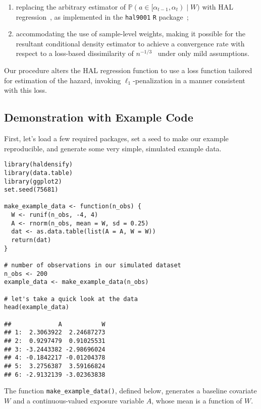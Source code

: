 \begin{enumerate}
  \item replacing the arbitrary estimator of $\mathbb{P}(a \in [\alpha_{t-1},
      \alpha_t) \mid W)$ with HAL regression~\citep{vdl2015generally,
      benkeser2016highly,vdl2017generally}, as implemented in the
      \texttt{hal9001} \texttt{R} package~\citep{coyle2021hal9001,
      hejazi2020hal9001};
  \item accommodating the use of sample-level weights, making it possible for
     the resultant conditional density estimator to achieve a convergence rate
     with respect to a loss-based dissimilarity of
     $n^{-1/3}$~\citep{bibaut2019fast} under only mild assumptions.
\end{enumerate}

Our procedure alters the HAL regression function to use a loss function tailored
for estimation of the hazard, invoking $\ell_1$-penalization in a manner
consistent with this loss.

\subsection{Demonstration with Example Code}

First, let's load a few required packages, set a seed to make our example
reproducible, and generate some very simple, simulated example data.

\begin{lstlisting}
library(haldensify)
library(data.table)
library(ggplot2)
set.seed(75681)

make_example_data <- function(n_obs) {
  W <- runif(n_obs, -4, 4)
  A <- rnorm(n_obs, mean = W, sd = 0.25)
  dat <- as.data.table(list(A = A, W = W))
  return(dat)
}

# number of observations in our simulated dataset
n_obs <- 200
example_data <- make_example_data(n_obs)

# let's take a quick look at the data
head(example_data)

##             A           W
## 1:  2.3063922  2.24687273
## 2:  0.9297479  0.91025531
## 3: -3.2443382 -2.98696024
## 4: -0.1842217 -0.01204378
## 5:  3.2756387  3.59166824
## 6: -2.9132139 -3.02363838
\end{lstlisting}

The function \texttt{make\_example\_data()}, defined below, generates a baseline
covariate $W$ and a continuous-valued exposure variable $A$, whose mean is a
function of $W$.

